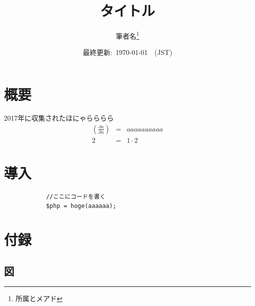 \documentclass[dvipdfmx]{jsarticle}
\title{\vspace{-3cm} タイトル}
\author{\vspace{-1cm} 筆者名\thanks{所属とメアド}}
\date{最終更新:~\today~\currenttime~(JST)}
\begin{document}
    \maketitle

    \setcounter{tocdepth}{3}
    \tableofcontents

    \makeatletter
    \renewcommand\listoftables{%
        \@starttoc{lot}%
    }

    \section*{概要}
        2017年に収集されたほにゃらららら\citep{nikkeidram4takai}\citep{akibagpu}
        \begin{eqnarray}
            \left( \frac{\partial x}{\partial n}\right) &=& aaaaaaaaaa\label{siki1}\\
            2 &=& 1 \cdot 2
        \end{eqnarray}
    \section{導入}
        \begin{lstlisting}
            //ここにコードを書く
            $php = hoge(aaaaaa);
        \end{lstlisting}

    \newpage
        
    \section*{付録}
      \setcounter{subsection}{0} %
      \renewcommand{\thesubsection}{\Alph{subsection}} %
      \setcounter{subsubsection}{0} %
      \renewcommand{\thesubsubsection}{\Alph{subsection}.\arabic{subsubsection}}
      \setcounter{equation}{0} %
      \renewcommand{\theequation}{\Alph{subsection}.\arabic{equation}}
      \setcounter{figure}{0} %
      \renewcommand{\thefigure}{\Alph{subsection}.\arabic{figure}}
      \setcounter{table}{0} %
      \renewcommand{\thetable}{\Alph{subsection}.\arabic{table}}

    
      \subsection{図}
\end{document}
